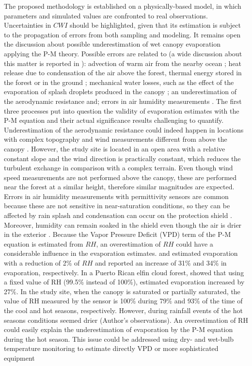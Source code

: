 \documentclass[a4paper,12pt]{article}
\begin{document}
The proposed methodology is established on a physically-based model, in which parameters and simulated values are confronted to real observations. Uncertainties in $CWI$ should be highlighted, given that its estimation is subject to the propagation of errors from both sampling and modeling. It remains open the discussion about possible underestimation of wet canopy evaporation applying the P-M theory. Possible errors are related to (a wide discussion about this matter is reported in \cite{vanDijketal2015}): advection of warm air from the nearby ocean \citep{Shuttleworth1979, Schellekensetal1999, Holwerdaetal2010}; heat release due to condensation of the air above the forest, thermal energy stored in the forest or in the ground \citep{Scatena1990, VanDijketal2001, vanDijketal2015}; mechanical water losses, such as the effect of the evaporation of splash droplets produced in the canopy \citep{Murakami2007, Dunkerley2009}; an underestimation of the aerodynamic resistance \citep{Holwerdaetal2012} and; errors in air humidity measurements \citep{Frumauetal2006, Holwerdaetal2010, Pryetetal2012a}. The first three processes put into question the validity of evaporation estimates with the P-M equation and their actual significance results challenging to quantify. Underestimation of the aerodynamic resistance could indeed happen in locations with complex topography and wind measurements different from above the canopy \citep{Holwerdaetal2012}. However, the study site is located in an open area with a relative constant slope and the wind direction is practically constant, which reduces the turbulent exchange in comparison with a complex terrain. Even though wind speed measurements are not performed above the canopy, these are performed near the forest at a similar height, therefore similar magnitudes are expected. Errors in air humidity measurements with permittivity sensors are common because these are not sensitive in near-saturation conditions, so they can be affected by rain splash and condensation can occur on the protection shield \citep{vanDijketal2015}. Moreover, humidity can remain soaked in the shield even though the air is drier in the exterior \citep{Pryetetal2012a}. Because the Vapor Pressure Deficit (VPD) term of the P-M equation is estimated from $RH$, an overestimation of $RH$ could have a considerable influence in the evaporation estimates. \cite{WallaceandMcJannet2008} and \cite{vanDijketal2015} estimated evaporation with a reduction of 2\% of $RH$ and reported an increase of 31\% and 34\% in evaporation, respectively. In a Puerto Rican elfin cloud forest,\cite{Holwerdaetal2006} showed that using a fixed value of RH (99.5\% instead of 100\%), estimated evaporation increased by 27\%. In the study site, when the canopy is saturated or partially saturated, the value of RH measured by the sensor is 100\% during 79\% and 93\% of the time of the cool and hot seasons, respectively. However, during rainfall events of the hot seasons conditions seemed drier (Author's observations). An overestimation of RH could easily explain the underestimation of evaporation by the P-M equation during the hot season. This issue could be addressed using dry- and wet-bulb temperature monitoring to estimate directly VPD \citep{Holwerdaetal2006, Holwerdaetal2010} or more sophisticated equipment 
\end{document}
